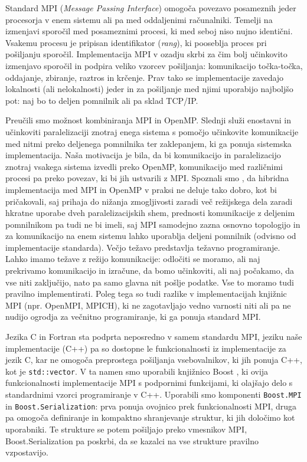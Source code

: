 \documentclass[a4paper,12pt]{book}
\begin{document}
Standard MPI (\emph{Message Passing Interface}) omogoča povezavo posameznih jeder procesorja v enem sistemu ali pa med oddaljenimi računalniki. Temelji na izmenjavi sporočil med posameznimi procesi, ki med seboj niso nujno identični. Vsakemu procesu je pripisan identifikator (\textit{rang}), ki pooseblja proces pri pošiljanju sporočil. Implementacija MPI v ozadju skrbi za čim bolj učinkovito izmenjavo sporočil in podpira veliko vzorcev pošiljanja: komunikacijo točka-točka, oddajanje, zbiranje, raztros in krčenje. Prav tako se implementacije zavedajo lokalnosti (ali nelokalnosti) jeder in za pošiljanje med njimi uporabijo najboljšo pot: naj bo to deljen pomnilnik \cite{mpisharedmemory} ali pa sklad TCP/IP. 

Preučili smo možnost kombiniranja MPI in OpenMP. Slednji služi enostavni in učinkoviti paralelizaciji znotraj enega sistema s pomočjo učinkovite komunikacije med nitmi preko deljenega pomnilnika ter zaklepanjem, ki ga ponuja sistemska implementacija. Naša motivacija je bila, da bi komunikacijo in paralelizacijo znotraj vsakega sistema izvedli preko OpenMP, komunikacijo med različnimi procesi pa preko povezav, ki bi jih ustvarili z MPI. Spoznali smo \cite{hybridmpiopenmp}, da hibridna implementacija med MPI in OpenMP v praksi ne deluje tako dobro, kot bi pričakovali, saj prihaja do nižanja zmogljivosti zaradi več režijskega dela zaradi hkratne uporabe dveh paralelizacijskih shem, prednosti komunikacije z deljenim pomnilnikom pa tudi ne bi imeli, saj MPI samodejno zazna osnovno topologijo in za komunikacijo na enem sistemu lahko uporablja deljeni pomnilnik (odvisno od implementacije standarda). Večjo težavo predstavlja težavno programiranje. Lahko imamo težave z režijo komunikacije: odločiti se moramo, ali naj prekrivamo komunikacijo in izračune, da bomo učinkoviti, ali naj počakamo, da vse niti zaključijo, nato pa samo glavna nit pošlje podatke. Vse to moramo tudi pravilno implementirati. Poleg tega so tudi razlike v implementacijah knjižnic MPI (npr. OpenMPI, MPICH), ki ne zagotavljajo vedno varnosti niti ali pa ne nudijo ogrodja za večnitno programiranje, ki ga ponuja standard MPI. 

Jezika C in Fortran sta podprta neposredno v samem standardu MPI, jeziku naše implementacije (C++) pa so dostopne le funkcionalnosti iz implementacije za jezik C, kar ne omogoča preprostega pošiljanja vsebovalnikov, ki jih ponuja C++, kot je \texttt{std::vector}. V ta namen smo uporabili knjižnico Boost \cite{boost}, ki ovija funkcionalnosti implementacije MPI s podpornimi funkcijami, ki olajšajo delo s standardnimi vzorci programiranje v C++. Uporabili smo komponenti \texttt{Boost.MPI} in \texttt{Boost.Serialization}: prva ponuja ovojnico prek funkcionalnosti MPI, druga pa omogoča definiranje in kompaktno shranjevanje struktur, ki jih določimo kot uporabniki. Te strukture se potem pošiljajo preko vmesnikov MPI, Boost.Serialization pa poskrbi, da se kazalci na vse strukture pravilno vzpostavijo. 
\end{document}
